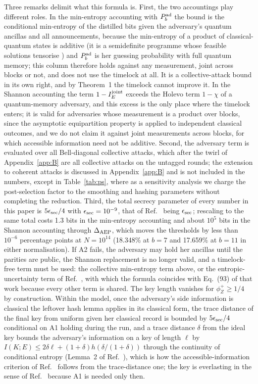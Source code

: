 \documentclass[aps,pra,twocolumn,superscriptaddress,nofootinbib]{revtex4-2}
\begin{document}
Three remarks delimit what this formula is. First, the two accountings play different roles. In the min-entropy accounting with $P^{\rm ad}_b$ the bound is the conditional min-entropy of the distilled bits given the adversary's quantum ancillas and all announcements, because the min-entropy of a product of classical-quantum states is additive (it is a semidefinite programme whose feasible solutions tensorise \cite{KRS09}) and $P^{\rm ad}_b$ is her guessing probability with full quantum memory; this column therefore holds against any measurement, joint across blocks or not, and does not use the timelock at all. It is a collective-attack bound in its own right, and by Theorem~1 the timelock cannot improve it. In the Shannon accounting the term $1-I_E^{\rm joint}$ exceeds the Holevo term $1-\chi$ of a quantum-memory adversary, and this excess is the only place where the timelock enters; it is valid for adversaries whose measurement is a product over blocks, since the asymptotic equipartition property is applied to independent classical outcomes, and we do not claim it against joint measurements across blocks, for which accessible information need not be additive. Second, the adversary term is evaluated over all Bell-diagonal collective attacks, which after the twirl of Appendix~\ref{app:B} are all collective attacks on the untagged rounds; the extension to coherent attacks is discussed in Appendix~\ref{app:B} and is not included in the numbers, except in Table~\ref{tab:ps}, where as a sensitivity analysis we charge the post-selection factor to the smoothing and hashing parameters without completing the reduction. Third, the total secrecy parameter of every number in this paper is $5\epsilon_{\rm sec}/4$ with $\epsilon_{\rm sec}=10^{-9}$, that of Ref.~\cite{T25} being $\epsilon_{\rm sec}$; rescaling to the same total costs 1.3 bits in the min-entropy accounting and about $10^5$ bits in the Shannon accounting through $\Delta_{\rm AEP}$, which moves the thresholds by less than $10^{-6}$ percentage points at $N=10^{14}$ (18.348\% at $b=7$ and 17.659\% at $b=11$ in either normalisation). If A2 fails, the adversary may hold her ancillas until the parities are public, the Shannon replacement is no longer valid, and a timelock-free term must be used: the collective min-entropy term above, or the entropic-uncertainty term of Ref.~\cite{T25}, with which the formula coincides with Eq.~(93) of that work because every other term is shared. The key length vanishes for $\phi_Z^+\ge1/4$ by construction. Within the model, once the adversary's side information is classical the leftover hash lemma applies in its classical form, the trace distance of the final key from uniform given her classical record is bounded by $5\epsilon_{\rm sec}/4$ conditional on A1 holding during the run, and a trace distance $\delta$ from the ideal key bounds the adversary's information on a key of length $\ell$ by $I(K;E)\le2\delta\ell+(1+\delta)h(\delta/(1+\delta))$ through the continuity of conditional entropy (Lemma~2 of Ref.~\cite{Win16}), which is how the accessible-information criterion of Ref.~\cite{VA20} follows from the trace-distance one; the key is everlasting in the sense of Ref.~\cite{VA20} because A1 is needed only then.
\end{document}
